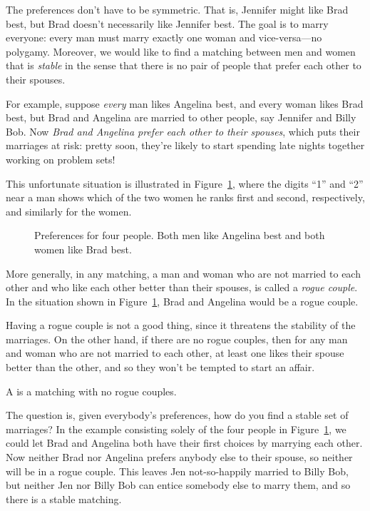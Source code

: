 The preferences don't have to be symmetric.  That is, Jennifer might
like Brad best, but Brad doesn't necessarily like Jennifer best.  The
goal is to marry everyone: every man must marry exactly one woman and
vice-versa---no polygamy.  Moreover, we would like to find a matching
between men and women that is \emph{stable} in the sense that there is
no pair of people that prefer each other to their spouses.

For example, suppose \emph{every} man likes Angelina best, and every
woman likes Brad best, but Brad and Angelina are married to other
people, say Jennifer and Billy Bob.  Now \emph{Brad and Angelina
  prefer each other to their spouses}, which puts their marriages at
risk: pretty soon, they're likely to start spending late nights
together working on problem sets!

This unfortunate situation is illustrated in
Figure~\ref{fig:minWtMatch2}, where the digits ``1'' and ``2'' near a
man shows which of the two women he ranks first and second,
respectively, and similarly for the women.

\begin{figure}


\caption{Preferences for four people.  Both men like Angelina best and
both women like Brad best.}
\label{fig:minWtMatch2}
\end{figure}

More generally, in any matching, a man and woman who are not married
to each other and who like each other better than their spouses, is
called a \emph{rogue couple}.  In the situation shown in
Figure~\ref{fig:minWtMatch2}, Brad and Angelina would be a rogue
couple.

Having a rogue couple is not a good thing, since it threatens the
stability of the marriages.  On the other hand, if there are no rogue
couples, then for any man and woman who are not married to each other,
at least one likes their spouse better than the other, and so they
won't be tempted to start an affair.

\begin{definition}
  A  is a matching with no rogue couples.
\end{definition}

The question is, given everybody's preferences, how do you find a
stable set of marriages?  In the example consisting solely of the four
people in Figure~\ref{fig:minWtMatch2}, we could let Brad and Angelina
both have their first choices by marrying each other.  Now neither
Brad nor Angelina prefers anybody else to their spouse, so neither
will be in a rogue couple.  This leaves Jen not-so-happily married to
Billy Bob, but neither Jen nor Billy Bob can entice somebody else to
marry them, and so there is a stable matching.

